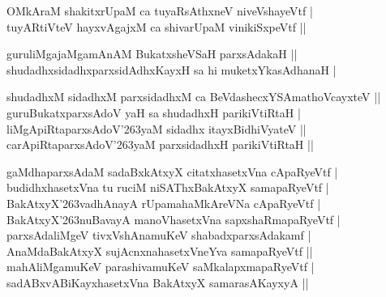 \begin{entry}
\begin{shl}
OMkAraM shakitxrUpaM ca tuyaRsAthxneV niveVshayeVtf |\\[2pt]
tuyARtiVteV hayxvAgajxM ca shivarUpaM vinikiSxpeVtf ||\\[-1pt]
\end{shl}
\medskip
{}
\smallskip
{}
\medskip
\begin{shl}
guruliMgajaMgamAnAM BukatxsheVSaH parxsAdakaH ||\\[2pt]
shudadhxsidadhxparxsidAdhxKayxH sa hi muketxYkasAdhanaH |\\[-1pt]
\end{shl}
\medskip
{}
\medskip
\begin{shl}
shudadhxM sidadhxM parxsidadhxM ca BeVdashecxYSAmathoVcayxteV ||\\[2pt]
guruBukatxparxsAdoV yaH sa shudadhxH parikiVtiRtaH |\\[2pt]
liMgApiRtaparxsAdoV{\char'263}yaM sidadhx itayxBidhiVyateV ||\\[2pt]
carApiRtaparxsAdoV{\char'263}yaM parxsidadhxH parikiVtiRtaH ||\\[-1pt]
\end{shl}
\medskip
{}
\smallskip
{}
\medskip
\begin{shl}
gaMdhaparxsAdaM sadaBxkAtxyX citatxhasetxVna cApaRyeVtf |\\[2pt]
budidhxhasetxVna tu ruciM niSAThxBakAtxyX samapaRyeVtf |\\[2pt]
BakAtxyX{\char'263}vadhAnayA rUpamahaMkAreVNa cApaRyeVtf |\\[2pt]
BakAtxyX{\char'263}nuBavayA manoVhasetxVna sapxshaRmapaRyeVtf |\\[2pt]
parxsAdaliMgeV tivxVshAnamuKeV shabadxparxsAdakamf |\\[2pt]
AnaMdaBakAtxyX sujAcnxnahasetxVneYva samapaRyeVtf ||\\[2pt]
mahAliMgamuKeV parashivamuKeV saMkalapxmapaRyeVtf |\\[2pt]
sadABxvABiKayxhasetxVna BakAtxyX samarasAKayxyA ||\\[-1pt]
\end{shl}

\end{entry}
